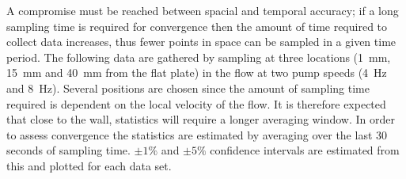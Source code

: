 \documentclass[12pt,oneside,a4paper]{article}
\begin{document}
A compromise must be reached between spacial and temporal accuracy; if a long sampling time is required for convergence then the amount of time required to collect data increases, thus fewer points in space can be sampled in a given time period. The following data are gathered by sampling at three locations (\SI{1}{mm}, \SI{15}{mm} and \SI{40}{mm} from the flat plate) in the flow at two pump speeds (\SI{4}{Hz} and \SI{8}{Hz}). Several positions are chosen since the amount of sampling time required is dependent on the local velocity of the flow. It is therefore expected that close to the wall, statistics will require a longer averaging window. In order to assess convergence the statistics are estimated by averaging over the last 30 seconds of sampling time. $\pm 1\%$ and $\pm 5\%$ confidence intervals are estimated from this and plotted for each data set.
\end{document}

